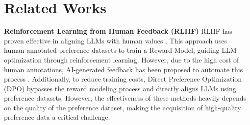 \section{Related Works}
\textbf{Reinforcement Learning from Human Feedback (RLHF)} 
RLHF has proven effective in aligning LLMs with human values \cite{christiano2017deep, ouyang2022training, bai2022training, song2023preference, touvron2023llama}. This approach uses human-annotated preference datasets to train a Reward Model, guiding LLM optimization through reinforcement learning. However, due to the high cost of human annotations, AI-generated feedback has been proposed to automate this process \citep{bai2022constitutional, lee2023rlaif}.
Additionally, to reduce training costs, Direct Preference Optimization (DPO) \cite{rafailov2023direct} bypasses the reward modeling process and directly aligns LLMs using preference datasets. However, the effectiveness of these methods heavily depends on the quality of the preference dataset, making the acquisition of high-quality preference data a critical challenge.

